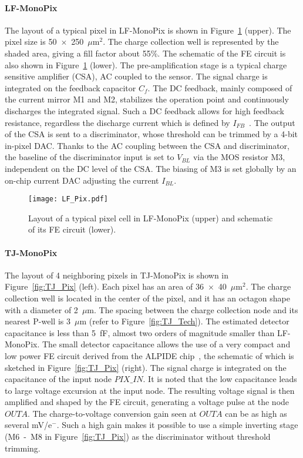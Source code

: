\documentclass[a4paper,11pt]{article}
\begin{document}
\paragraph{LF-MonoPix}
The layout of a typical pixel in LF-MonoPix is shown in Figure~\ref{fig:LF_Pix} (upper). The pixel size is 50~$\times$~250~$\mu$m$^{2}$. The charge collection well is represented by the shaded area, giving a fill factor about 55\%. The schematic of the FE circuit is also shown in Figure~\ref{fig:LF_Pix} (lower). The pre-amplification stage is a typical charge sensitive amplifier (CSA), AC coupled to the sensor. The signal charge is integrated on the feedback capacitor $C_{f}$. The DC feedback, mainly composed of the current mirror M1 and M2, stabilizes the operation point and continuously discharges the integrated signal. Such a DC feedback allows for high feedback resistance, regardless the discharge current which is defined by $I_{FB}$~\cite{FE_Blanquart_1997}. The output of the CSA is sent to a discriminator, whose threshold can be trimmed by a 4-bit in-pixel DAC. Thanks to the AC coupling between the CSA and discriminator, the baseline of the discriminator input is set to $V_{BL}$ via the MOS resistor M3, independent on the DC level of the CSA. The biasing of M3 is set globally by an on-chip current DAC adjusting the current $I_{BL}$. 

\begin{figure}[htbp]
  \centering
  \texttt{[image: LF\_Pix.pdf]}
  \caption{Layout of a typical pixel cell in LF-MonoPix (upper) and schematic of its FE circuit (lower).} 
  \label{fig:LF_Pix}
\end{figure}

\paragraph{TJ-MonoPix}
The layout of 4 neighboring pixels in TJ-MonoPix is shown in  Figure~\ref{fig:TJ_Pix} (left). Each pixel has an area of 36~$\times$~40~$\mu$m$^{2}$. The charge collection well is located in the center of the pixel, and it has an octagon shape with a diameter of 2~$\mu$m. The spacing between the charge collection node and its nearest P-well is 3~$\mu$m (refer to Figure~\ref{fig:TJ_Tech}). The estimated detector capacitance is less than 5~fF, almost two orders of magnitude smaller than LF-MonoPix. The small detector capacitance allows the use of a very compact and low power FE circuit derived from the ALPIDE chip~\cite{AlpideFE_Kim_2016}, the schematic of which is sketched in Figure~\ref{fig:TJ_Pix} (right). The signal charge is integrated on the capacitance of the input node $PIX\_IN$. It is noted that the low capacitance leads to large voltage excursion at the input node. The resulting voltage signal is then amplified and shaped by the FE circuit, generating a voltage pulse at the node $OUTA$. The charge-to-voltage conversion gain seen at $OUTA$ can be as high as several mV/e$^{-}$. Such a high gain makes it possible to use a simple inverting stage (M6~-~M8 in Figure~\ref{fig:TJ_Pix}) as the discriminator without threshold trimming. 
\end{document}
